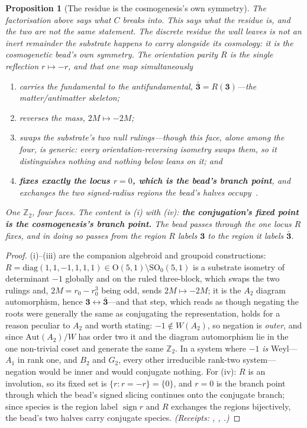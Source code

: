 \documentclass[11pt]{article}
\theoremstyle{plain}
\newtheorem{proposition}{Proposition}
\theoremstyle{remark}
\begin{document}
\begin{proposition}[The residue is the cosmogenesis's own symmetry]\label{prop:residue-is-the-bead}
The factorisation above says what $C$ breaks into. This says what the residue \emph{is}, and the two are not the same statement. The discrete residue the wall leaves is not an inert remainder the substrate happens to carry alongside its cosmology: \emph{it is the cosmogenetic bead's own symmetry.} The orientation parity $R$ is the single reflection $r\mapsto-r$, and that one map simultaneously
\begin{enumerate}
\item[\textup{(i)}] carries the fundamental to the antifundamental, $\bar{\mathbf 3}=R(\mathbf 3)$---the matter/antimatter skeleton;
\item[\textup{(ii)}] reverses the mass, $2M\mapsto-2M$;
\item[\textup{(iii)}] swaps the substrate's two null rulings---though this face, alone among the four, is \emph{generic}: \emph{every} orientation-reversing isometry swaps them, so it distinguishes nothing and nothing below leans on it; and
\item[\textup{(iv)}] \textbf{fixes exactly the locus $r=0$, which is the bead's branch point}, and exchanges the two signed-radius regions the bead's halves occupy~\cite{JanzenCRframework}.
\end{enumerate}
\emph{One $\mathbb{Z}_2$, four faces.} The content is \textup{(i)} with \textup{(iv)}: \textbf{the conjugation's fixed point is the cosmogenesis's branch point.} The bead passes \emph{through} the one locus $R$ fixes, and in doing so passes from the region $R$ labels $\mathbf 3$ to the region it labels $\bar{\mathbf 3}$.
\end{proposition}

\begin{proof}
\textup{(i)}--\textup{(iii)} are the companion algebroid and groupoid constructions: $R=\mathrm{diag}(1,1,-1,1,1,1)\in\mathrm{O}(5,1)\setminus\mathrm{SO}_0(5,1)$ is a substrate isometry of determinant $-1$ globally and on the ruled three-block, which swaps the two rulings and, $2M=r_0-r_0^3$ being odd, sends $2M\mapsto-2M$; it is the $A_2$ diagram automorphism, hence $\mathbf 3\leftrightarrow\bar{\mathbf 3}$---and that step, which reads as though negating the roots were generally the same as conjugating the representation, holds for a reason peculiar to $A_2$ and worth stating: $-1\notin W(A_2)$, so negation is \emph{outer}, and since $\mathrm{Aut}(A_2)/W$ has order two it and the diagram automorphism lie in the one non-trivial coset and generate the same $\mathbb{Z}_2$. In a system where $-1$ \emph{is} Weyl---$A_1$ in rank one, and $B_2$ and $G_2$, every other irreducible rank-two system---negation would be inner and would conjugate nothing. For \textup{(iv)}: $R$ is an involution, so its fixed set is $\{r:r=-r\}=\{0\}$, and $r=0$ is the branch point through which the bead's signed slicing continues onto the conjugate branch; since species is the region label $\operatorname{sign}r$ and $R$ exchanges the regions bijectively, the bead's two halves carry conjugate species. \emph{(Receipts: , , .)}
\end{proof}
\end{document}
